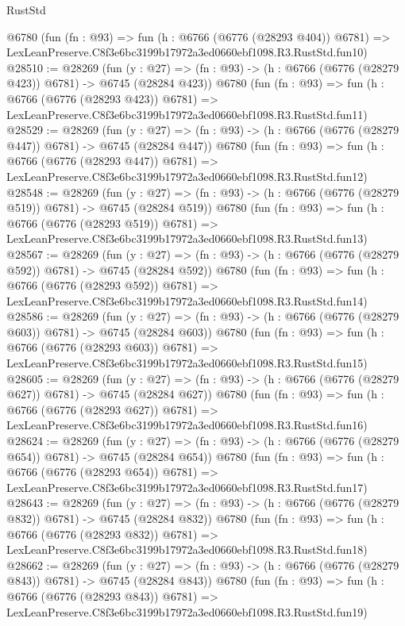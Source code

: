 \begin{lexlean}{RustStd}
\begin{coremodule}
    @6780
    (fun (fn : @93) =>
    fun (h : @6766 (@6776 (@28293 @404)) @6781) =>
    LexLeanPreserve.C8f3e6bc3199b17972a3ed0660ebf1098.R3.RustStd.fun10)
@28510 := @28269
    (fun (y : @27) => (fn : @93) -> (h : @6766 (@6776 (@28279 @423)) @6781) -> @6745 (@28284 @423))
    @6780
    (fun (fn : @93) =>
    fun (h : @6766 (@6776 (@28293 @423)) @6781) =>
    LexLeanPreserve.C8f3e6bc3199b17972a3ed0660ebf1098.R3.RustStd.fun11)
@28529 := @28269
    (fun (y : @27) => (fn : @93) -> (h : @6766 (@6776 (@28279 @447)) @6781) -> @6745 (@28284 @447))
    @6780
    (fun (fn : @93) =>
    fun (h : @6766 (@6776 (@28293 @447)) @6781) =>
    LexLeanPreserve.C8f3e6bc3199b17972a3ed0660ebf1098.R3.RustStd.fun12)
@28548 := @28269
    (fun (y : @27) => (fn : @93) -> (h : @6766 (@6776 (@28279 @519)) @6781) -> @6745 (@28284 @519))
    @6780
    (fun (fn : @93) =>
    fun (h : @6766 (@6776 (@28293 @519)) @6781) =>
    LexLeanPreserve.C8f3e6bc3199b17972a3ed0660ebf1098.R3.RustStd.fun13)
@28567 := @28269
    (fun (y : @27) => (fn : @93) -> (h : @6766 (@6776 (@28279 @592)) @6781) -> @6745 (@28284 @592))
    @6780
    (fun (fn : @93) =>
    fun (h : @6766 (@6776 (@28293 @592)) @6781) =>
    LexLeanPreserve.C8f3e6bc3199b17972a3ed0660ebf1098.R3.RustStd.fun14)
@28586 := @28269
    (fun (y : @27) => (fn : @93) -> (h : @6766 (@6776 (@28279 @603)) @6781) -> @6745 (@28284 @603))
    @6780
    (fun (fn : @93) =>
    fun (h : @6766 (@6776 (@28293 @603)) @6781) =>
    LexLeanPreserve.C8f3e6bc3199b17972a3ed0660ebf1098.R3.RustStd.fun15)
@28605 := @28269
    (fun (y : @27) => (fn : @93) -> (h : @6766 (@6776 (@28279 @627)) @6781) -> @6745 (@28284 @627))
    @6780
    (fun (fn : @93) =>
    fun (h : @6766 (@6776 (@28293 @627)) @6781) =>
    LexLeanPreserve.C8f3e6bc3199b17972a3ed0660ebf1098.R3.RustStd.fun16)
@28624 := @28269
    (fun (y : @27) => (fn : @93) -> (h : @6766 (@6776 (@28279 @654)) @6781) -> @6745 (@28284 @654))
    @6780
    (fun (fn : @93) =>
    fun (h : @6766 (@6776 (@28293 @654)) @6781) =>
    LexLeanPreserve.C8f3e6bc3199b17972a3ed0660ebf1098.R3.RustStd.fun17)
@28643 := @28269
    (fun (y : @27) => (fn : @93) -> (h : @6766 (@6776 (@28279 @832)) @6781) -> @6745 (@28284 @832))
    @6780
    (fun (fn : @93) =>
    fun (h : @6766 (@6776 (@28293 @832)) @6781) =>
    LexLeanPreserve.C8f3e6bc3199b17972a3ed0660ebf1098.R3.RustStd.fun18)
@28662 := @28269
    (fun (y : @27) => (fn : @93) -> (h : @6766 (@6776 (@28279 @843)) @6781) -> @6745 (@28284 @843))
    @6780
    (fun (fn : @93) =>
    fun (h : @6766 (@6776 (@28293 @843)) @6781) =>
    LexLeanPreserve.C8f3e6bc3199b17972a3ed0660ebf1098.R3.RustStd.fun19)

\end{coremodule}
\end{lexlean}
